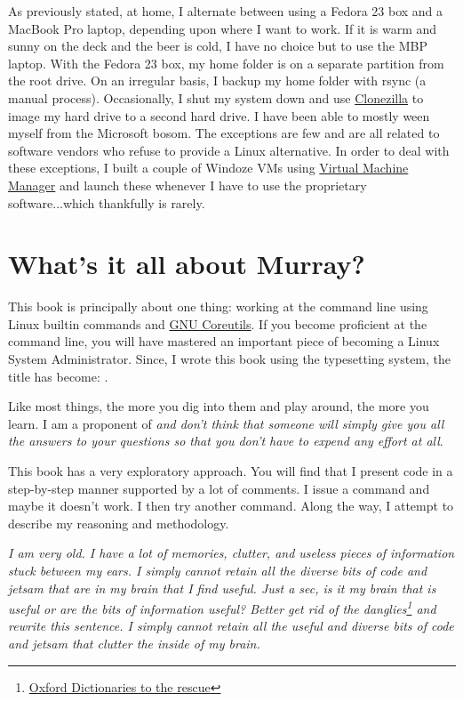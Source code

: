 As previously stated, at home, I alternate between using a Fedora 23 box and a MacBook Pro laptop, depending upon where I want to work. If it is warm and sunny on the deck and the beer is cold, I have no choice but to use the MBP laptop. With the Fedora 23 box, my home folder is on a separate partition from the root drive. On an irregular basis, I backup my home folder with rsync (a manual process). Occasionally, I shut my system down and use \href{http://clonezilla.org/downloads.php}{Clonezilla} to image my hard drive to a second hard drive. I have been able to mostly ween myself from the Microsoft bosom. The exceptions are few and are all related to software vendors who refuse to provide a Linux alternative. In order to deal with these exceptions, I built a couple of Windoze VMs using \href{http://virt-manager.ort}{Virtual Machine Manager} and launch these whenever I have to use the proprietary software...which thankfully is rarely.

\section{What's it all about Murray?}
\label{sec:allabout}

This book is principally about one thing: working at the command line using Linux builtin commands and \href{http://www.gnu.org/software/coreutils/coreutils.html}{GNU Coreutils}. If you become proficient at the command line, you will have mastered an important piece of becoming a Linux System Administrator. Since, I wrote this book using the \latex typesetting system, the title has become: .

Like most things, the more you dig into them and play around, the more you learn. I am a proponent of \textit{ and don't think that someone will simply give you all the answers to your questions so that you don't have to expend any effort at all}.

This book has a very exploratory approach. You will find that I present code in a step-by-step manner supported by a lot of comments. I issue a command and maybe it doesn't work. I then try another command. Along the way, I attempt to describe my reasoning and methodology.


\begin{addmargin}[1em]{2em}
\textit{I am very old. I have a lot of memories, clutter, and useless pieces of information stuck between my ears. I simply cannot retain all the diverse bits of code and jetsam that are in my brain that I find useful. Just a sec, is it my brain that is useful or are the bits of information useful? Better get rid of the danglies\footnote{\href{http://blog.oxforddictionaries.com/2011/09/participles-how-not-to-dangle/}{Oxford Dictionaries to the rescue}} and rewrite this sentence. I simply cannot retain all the useful and diverse bits of code and jetsam that clutter the inside of my brain.}
\end{addmargin}

